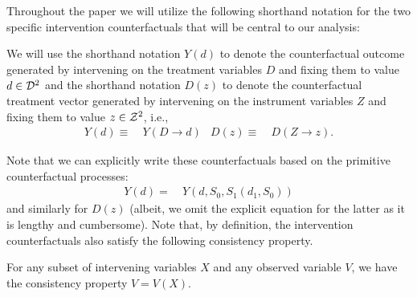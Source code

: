 Throughout the paper we will utilize the following shorthand notation for the two specific intervention counterfactuals that will be central to our analysis:
\begin{definition}\label{defn:central-cnt} We will use the shorthand notation $Y(d)$ to denote the counterfactual outcome generated by intervening on the treatment variables $D$ and fixing them to value $d\in {\cal D}^2$ and the shorthand notation $D(z)$ to denote the counterfactual treatment vector generated by intervening on the instrument variables $Z$ and fixing them to value $z\in {\cal Z}^2$, i.e., 
\begin{align}
Y(d)\equiv~& Y(D\to d) & 
D(z)\equiv~& D(Z\to z).
\end{align}
\end{definition}
Note that we can explicitly write these counterfactuals based on the primitive counterfactual processes:
\begin{align*}
    Y(d) =~& Y(d, S_0, S_1(d_1, S_0))
\end{align*}
and similarly for $D(z)$ (albeit, we omit the explicit equation for the latter as it is lengthy and cumbersome). Note that, by definition, the intervention counterfactuals also satisfy the following consistency property.
\begin{property} For any subset of intervening variables $X$ and any observed variable $V$, we have the consistency property $V=V(X)$.
\end{property}

